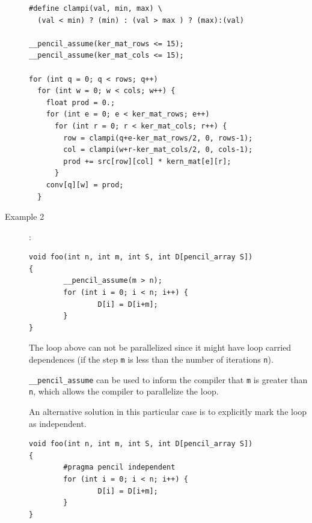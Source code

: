 \documentclass{carp}
\begin{document}
\begin{description}
\begin{lstlisting}[language=pencil]
#define clampi(val, min, max) \
  (val < min) ? (min) : (val > max ) ? (max):(val)

__pencil_assume(ker_mat_rows <= 15);
__pencil_assume(ker_mat_cols <= 15);

for (int q = 0; q < rows; q++)
  for (int w = 0; w < cols; w++) {
    float prod = 0.;
    for (int e = 0; e < ker_mat_rows; e++)
      for (int r = 0; r < ker_mat_cols; r++) {
        row = clampi(q+e-ker_mat_rows/2, 0, rows-1);
        col = clampi(w+r-ker_mat_cols/2, 0, cols-1);
        prod += src[row][col] * kern_mat[e][r];
      }
    conv[q][w] = prod;
  }
\end{lstlisting}
  
\item [{Example 2}]:
  \begin{lstlisting}[language=pencil]
void foo(int n, int m, int S, int D[pencil_array S])
{
        __pencil_assume(m > n);
        for (int i = 0; i < n; i++) {
                D[i] = D[i+m];
        }
}
  \end{lstlisting}
The loop above can not be parallelized since it might have loop
carried dependences (if the step \lstinline!m! is less than the
number of iterations \lstinline!n!).

\lstinline!__pencil_assume! can be used to inform the compiler that
\lstinline!m! is greater than \lstinline!n!, which allows the compiler
to parallelize the loop.

An alternative solution in this particular case is to explicitly
mark the loop as independent.

  \begin{lstlisting}[language=pencil]
void foo(int n, int m, int S, int D[pencil_array S])
{
        #pragma pencil independent
        for (int i = 0; i < n; i++) {
                D[i] = D[i+m];
        }
}
  \end{lstlisting}
\end{description}
\end{document}
